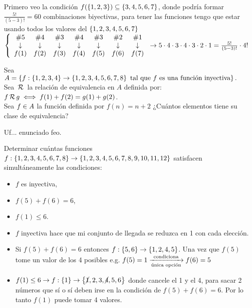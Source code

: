 \documentclass[12pt,a4paper, spanish]{article}
\begin{document}
\separadorCorto

Primero veo la condición  $f(\set{1,2,3}) \subseteq \set{3,4,5,6,7}$, donde podría formar $\frac{5!}{(5-3)!} = 60$ combinaciones biyectivas,
para tener las funciones tengo que estar usando todos los valores del $\set{1,2,3,4,5,6,7}$\\
$\llave{c c c c c c c}{
		\#5 & \#4 & \#3 & \#4 & \#3 & \#2 & \#1 \\
		\downarrow & \downarrow & \downarrow &\downarrow &\downarrow &\downarrow &\downarrow\\
		f(1) & f(2) &f(3) &f(4) &f(5) &f(6) &f(7)
	}
	\to 5 \cdot 4 \cdot 3 \cdot 4 \cdot 3 \cdot 2 \cdot 1 = \frac{5!}{(5-3)!} \cdot 4!$

\ejercicio
Sea $A = \set{f : \set{1,2,3,4} \to \set{1,2,3,4,5,6,7,8} \text{ tal que $f$ es una función inyectiva}}.$\\
Sea $\relacion$ la relación de equivalencia en $A$ definida por: $f \relacion g \sisolosi f(1) + f(2) = g(1) + g(2)$.\\
Sea $f \en A$ la función definida por $f(n) = n+2$ ¿Cuántos elementos tiene su clase de equivalencia?

\separadorCorto

Uf... enunciado feo.\\


\ejercicio

Determinar cuántas funciones $f : \set{1,2,3,4,5,6,7,8} \to \set{\foreach \i in {1,...,11}{ \i, }12}$ satisfacen
simultáneamente las condiciones:\\
\begin{multicols}{3}
	\begin{itemize}
		\item $f$ es inyectiva,
		\item $f(5) + f(6) = 6$,
		\item $f(1) \leq 6$.
	\end{itemize}
\end{multicols}

\separadorCorto

\begin{itemize}
	\item $f$ inyectiva hace que mi conjunto de llegada se reduzca en 1 con cada elección.

	\item Si $f(5) + f(6) = 6$ entonces $f: \set{5,6} \to \set{1,2,4,5}$. Una vez que $f(5)$ tome
	      un valor de los 4 posibles e.g. $f(5) = 1 \flecha{condiciona}[única opción] f(6) = 5 $

	\item $f(1) \leq 6 \to f : \set{1} \to \set{\cancel{1},2,3,\cancel{4},5,6}$ donde cancele el 1
	      y el 4, para sacar 2 números que sí o sí deben irse en la condición de $f(5) + f(6) = 6$. Por lo
	      tanto $f(1)$ puede tomar 4 valores.
\end{itemize}
\end{document}
